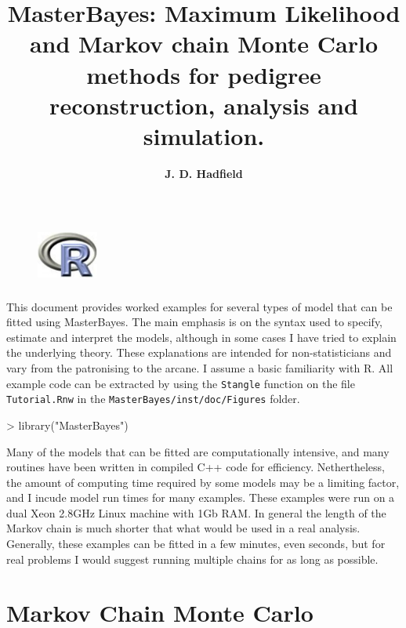\documentclass{article}
\title{\bf{\Large{MasterBayes: Maximum Likelihood and Markov chain Monte Carlo methods for pedigree reconstruction, analysis and simulation.}}}
\author{\bf{\large{J. D. Hadfield}}}
\begin{document}
\maketitle
\begin{figure}[!h]
\begin{center}
\includegraphics[height=2cm, width=2cm]{Rlogo}
\end{center}
\end{figure}

\newpage

\tableofcontents

\newpage

This document provides worked examples for several types of model that can be fitted using MasterBayes.  The main emphasis is on the syntax used to specify, estimate and interpret the models, although in some cases I have tried to explain the underlying theory.  These explanations are intended for non-statisticians and vary from the patronising to the arcane. I assume a basic familiarity with R.  All example code can be extracted by using the \texttt{Stangle} function on the file \texttt{Tutorial.Rnw} in the \texttt{MasterBayes/inst/doc/Figures} folder.

\begin{Schunk}
\begin{Sinput}
> library("MasterBayes")
\end{Sinput}
\end{Schunk}

Many of the models that can be fitted are computationally intensive, and many routines have been written in compiled C++ code for efficiency.  Nethertheless, the amount of computing time required by some models may be a limiting factor, and I incude model run times for many examples.  These examples were run on a dual Xeon 2.8GHz Linux machine with 1Gb RAM. In general the length of the Markov chain is much shorter that what would be used in a real analysis.  Generally, these examples can be fitted in a few minutes, even seconds, but for real problems I would suggest running multiple chains for as long as possible.  


\section{\large{Markov Chain Monte Carlo}}
\label{MCMC-sec}
\end{document}
